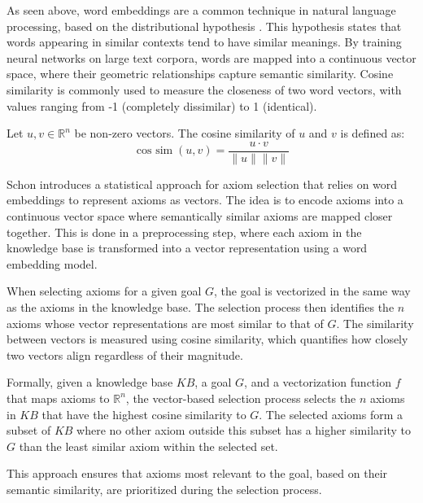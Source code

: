 \documentclass[english,version-2020-11]{uzl-thesis}
\begin{document}
As seen above, word embeddings are a common technique in natural language processing, based on the distributional hypothesis \cite{Miller1991}. This hypothesis states that words appearing in similar contexts tend to have similar meanings. By training neural networks on large text corpora, words are mapped into a continuous vector space, where their geometric relationships capture semantic similarity. Cosine similarity is commonly used to measure the closeness of two word vectors, with values ranging from -1 (completely dissimilar) to 1 (identical).

\begin{definition}
    Let \( u, v \in \mathbb{R}^n \) be non-zero vectors. The cosine similarity of \( u \) and \( v \) is defined as:
    \begin{equation}
        \operatorname{cos\ sim}(u, v) = \frac{u \cdot v}{\|u\| \|v\|}
    \end{equation}
\end{definition}

Schon \cite{Schon2023} introduces a statistical approach for axiom selection that relies on word embeddings to represent axioms as vectors. The idea is to encode axioms into a continuous vector space where semantically similar axioms are mapped closer together. This is done in a preprocessing step, where each axiom in the knowledge base is transformed into a vector representation using a word embedding model.

When selecting axioms for a given goal \( G \), the goal is vectorized in the same way as the axioms in the knowledge base. The selection process then identifies the \( n \) axioms whose vector representations are most similar to that of \( G \). The similarity between vectors is measured using cosine similarity, which quantifies how closely two vectors align regardless of their magnitude.

Formally, given a knowledge base \( KB \), a goal \( G \), and a vectorization function \( f \) that maps axioms to \( \mathbb{R}^n \), the vector-based selection process selects the \( n \) axioms in \( KB \) that have the highest cosine similarity to \( G \). The selected axioms form a subset of \( KB \) where no other axiom outside this subset has a higher similarity to \( G \) than the least similar axiom within the selected set.

This approach ensures that axioms most relevant to the goal, based on their semantic similarity, are prioritized during the selection process.
\end{document}
